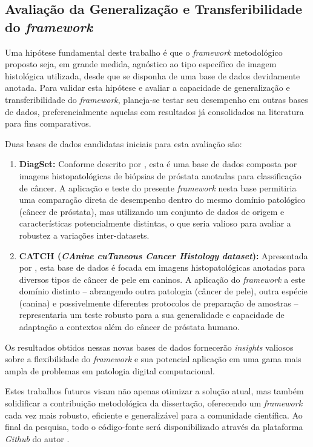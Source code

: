 \subsection{Avaliação da Generalização e Transferibilidade do \textit{framework}}\label{subsec:futuros_generalizacao}
Uma hipótese fundamental deste trabalho é que o \textit{framework} metodológico proposto seja, em grande medida, agnóstico ao tipo específico de imagem histológica utilizada, desde que se disponha de uma base de dados devidamente anotada. Para validar esta hipótese e avaliar a capacidade de generalização e transferibilidade do \textit{framework}, planeja-se testar seu desempenho em outras bases de dados, preferencialmente aquelas com resultados já consolidados na literatura para fins comparativos.

Duas bases de dados candidatas iniciais para esta avaliação são:
\begin{enumerate}
    \item \textbf{DiagSet:} Conforme descrito por \textcite{Koziarski2024DiagSet}, esta é uma base de dados composta por imagens histopatológicas de biópsias de próstata anotadas para classificação de câncer. A aplicação e teste do presente \textit{framework} nesta base permitiria uma comparação direta de desempenho dentro do mesmo domínio patológico (câncer de próstata), mas utilizando um conjunto de dados de origem e características potencialmente distintas, o que seria valioso para avaliar a robustez a variações inter-datasets.
    \item \textbf{CATCH (\textit{CAnine cuTaneous Cancer Histology dataset}):} Apresentada por \textcite{Wilm2022CATCH}, esta base de dados é focada em imagens histopatológicas anotadas para diversos tipos de câncer de pele em caninos. A aplicação do \textit{framework} a este domínio distinto – abrangendo outra patologia (câncer de pele), outra espécie (canina) e possivelmente diferentes protocolos de preparação de amostras – representaria um teste robusto para a sua generalidade e capacidade de adaptação a contextos além do câncer de próstata humano.
\end{enumerate}

Os resultados obtidos nessas novas bases de dados fornecerão \textit{insights} valiosos sobre a flexibilidade do \textit{framework} e sua potencial aplicação em uma gama mais ampla de problemas em patologia digital computacional.

Estes trabalhos futuros visam não apenas otimizar a solução atual, mas também solidificar a contribuição metodológica da dissertação, oferecendo um \textit{framework} cada vez mais robusto, eficiente e generalizável para a comunidade científica. Ao final da pesquisa, todo o código-fonte será disponibilizado através da plataforma \textit{Github} do autor \cite{nunes2025mastercoding}.